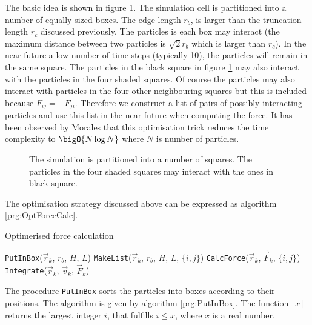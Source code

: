 The basic idea is shown in figure \ref{fig:BuffZone}. The simulation
cell is partitioned into a number of equally sized boxes. The edge
length $r_b$, is larger than the truncation length $r_c$ discussed
previously. The particles is each box may interact (the maximum
distance between two particles is $\sqrt{2}r_b$ which is larger than
$r_c$). In the near future \ie a low number of time steps (typically
10), the particles will remain in the same square. The particles in the
black square in figure \ref{fig:BuffZone} may also interact with the
particles in the four shaded squares. Of course the particles may also
interact with particles in the four other neighbouring squares but
this is included because $F_{ij} = -F_{ji}$. Therefore we construct a
list of pairs of possibly interacting particles and use this list in
the near future when computing the force. It has been observed by
Morales \etal \cite{Morales92} that this optimisation trick reduces
the time complexity to $\bigO{N\log N}$ where $N$ is number of
particles. 

\begin{figure}
  \begin{center}
    
  \end{center}
  \caption[The cell-list method]{The simulation is partitioned into a number of
  squares. The particles in the four shaded squares may interact with the
  ones in black square.\label{fig:BuffZone}}
\end{figure}

The optimisation strategy discussed above can be expressed as
algorithm \ref{prg:OptForceCalc}. 

\begin{algorithm}
  \caption[Optimerised force calculation]{Optimerised force calculation}
  \label{prg:OptForceCalc}
  \begin{algorithmic}
      \STATE \texttt{PutInBox}($\vec{r}_k$, $r_b$, $H$, $L$)
      \STATE \texttt{MakeList}($\vec{r}_k$, $r_b$, $H$, $L$, $\{i, j\}$)
    \ENDIF
    \STATE \texttt{CalcForce}($\vec{r}_k$, $\vec{F}_k$, $\{i, j\}$)
    \STATE \texttt{Integrate}($\vec{r}_k$, $\vec{v}_k$, $\vec{F}_k$)
    \ENDFOR
  \end{algorithmic}
\end{algorithm}

The procedure \texttt{PutInBox} sorts the particles into boxes
according to their positions. The algorithm is given by algorithm
\ref{prg:PutInBox}. The function $\lceil x\rceil$ returns the
largest integer $i$, that fulfills $i\le x$, where $x$ is a real
number. 

